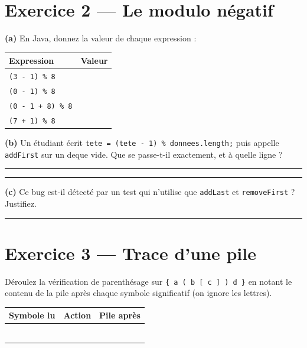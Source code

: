 \documentclass[11pt,a4paper]{article}
\newcommand{\lig}[1]{\rule{#1}{0.4pt}}
\begin{document}
\section{Exercice 2 --- Le modulo négatif}

\noindent\textbf{(a)} En Java, donnez la valeur de chaque expression :

\vspace{0.2cm}
\begin{center}
\begin{tabular}{lc}
\toprule
\textbf{Expression} & \textbf{Valeur} \\
\midrule
\texttt{(3 - 1) \% 8}     & \rule{0pt}{0.7cm} \\
\texttt{(0 - 1) \% 8}     & \rule{0pt}{0.7cm} \\
\texttt{(0 - 1 + 8) \% 8} & \rule{0pt}{0.7cm} \\
\texttt{(7 + 1) \% 8}     & \rule{0pt}{0.7cm} \\
\bottomrule
\end{tabular}
\end{center}

\vspace{0.3cm}
\noindent\textbf{(b)} Un étudiant écrit \texttt{tete = (tete - 1) \% donnees.length;}
puis appelle \texttt{addFirst} sur un deque vide. Que se passe-t-il
exactement, et à quelle ligne ? \lig{10cm}

\vspace{0.2cm}
\noindent\lig{14cm}

\vspace{0.3cm}
\noindent\textbf{(c)} Ce bug est-il détecté par un test qui n'utilise que
\texttt{addLast} et \texttt{removeFirst} ? Justifiez. \lig{9cm}

\section{Exercice 3 --- Trace d'une pile}

Déroulez la vérification de parenthésage sur
\texttt{\{ a ( b [ c ] ) d \}} en notant le contenu de la pile après chaque
symbole significatif (on ignore les lettres).

\vspace{0.3cm}
\begin{center}
\begin{tabular}{lll}
\toprule
\textbf{Symbole lu} & \textbf{Action} & \textbf{Pile après} \\
\midrule
\rule{0pt}{0.7cm} & & \\
\rule{0pt}{0.7cm} & & \\
\rule{0pt}{0.7cm} & & \\
\rule{0pt}{0.7cm} & & \\
\rule{0pt}{0.7cm} & & \\
\rule{0pt}{0.7cm} & & \\
\bottomrule
\end{tabular}
\end{center}
\end{document}
